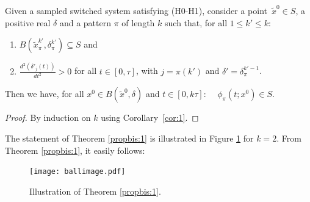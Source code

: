 \begin{theorem}
Given a sampled switched system satisfying (H0-H1),
%
consider a point~$\tilde{x}^0\in S$, a positive real  $\delta$ %
and a pattern $\pi$ of length $k$ such that, for all $1\leq k'\leq k$:
\begin{enumerate}
\item $B(\tilde{x}_\pi^{k'}, \delta_{\pi}^{k'}) \subseteq S$ and
%
\item $\frac{d^2(\delta'_j(t))}{dt^2}>0$ for all $t\in [0,\tau]$, with $j=\pi(k')$ and $\delta'=\delta_\pi^{k'-1}$.
\end{enumerate}
%
Then we have, for all $x^0\in B(\tilde{x}^0,\delta)$ and $t\in [0,k\tau]$:\ \ 
$\phi_{\pi}(t;x^0)\in S$.
%
\label{propbis:1}
\end{theorem}
\begin{proof}
By induction on $k$ using Corollary~\ref{cor:1}.
%
\end{proof}

The statement of Theorem \ref{propbis:1} is illustrated in Figure \ref{fig:tube} for $k=2$. From Theorem \ref{propbis:1}, it easily follows:
\begin{figure}[ht]
\centering
 \texttt{[image: ballimage.pdf]}
\caption{Illustration of Theorem \ref{propbis:1}.}
 \label{fig:tube}
\end{figure}



